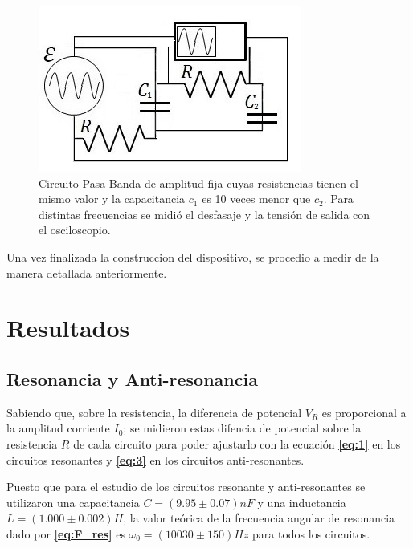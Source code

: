 \documentclass[11pt,a4paper]{article}
\begin{document}
\begin{figure}[h]
\centering
\includegraphics[scale=0.8]{Circuito-RC-Pasa-Banda}
  \caption{Circuito Pasa-Banda de amplitud fija cuyas resistencias tienen el mismo valor y la capacitancia $c_{1}$ es 10 veces menor que $c_{2}$. Para distintas frecuencias se midió el desfasaje y la tensión de salida con el osciloscopio.}
  \label{fig:RC-PBD}
\end{figure}

Una vez finalizada la construccion del dispositivo, se procedio a medir de la manera detallada anteriormente.



\section{Resultados}


\subsection{Resonancia y Anti-resonancia}

Sabiendo que, sobre la resistencia, la diferencia de potencial $V_R$ es proporcional a la amplitud corriente $I_0$; se midieron estas difencia de potencial sobre la resistencia $R$ de cada circuito para poder ajustarlo con la ecuación \textbf{\eqref{eq:1}} en los circuitos resonantes y \textbf{\eqref{eq:3}} en los circuitos anti-resonantes.  

Puesto que para el estudio de los circuitos resonante y anti-resonantes se utilizaron una capacitancia $C= (9.95 \pm 0.07)nF$ y una inductancia $L= (1.000 \pm 0.002) H$, la valor teórica de la frecuencia angular de resonancia dado por \textbf{\eqref{eq:F_res}} es $\omega_{0}=(10030 \pm 150) Hz$ para todos los circuitos.
\end{document}
